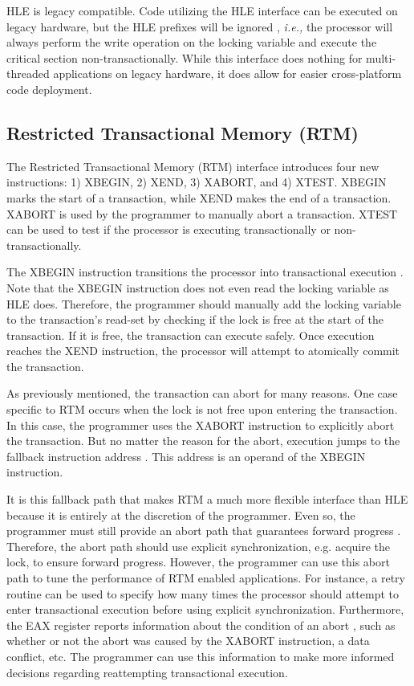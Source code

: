 \documentclass[11pt]{book}
\begin{document}
HLE is legacy compatible.  Code utilizing the HLE interface can be executed on legacy
hardware, but the HLE prefixes will be ignored \cite{intel_prog_ref}, \emph{i.e.,} the
processor will always perform the write operation on the locking variable and execute the
critical section non-transactionally.  While this interface does nothing for
multi-threaded applications on legacy hardware, it does allow for easier cross-platform
code deployment.

\subsection{Restricted Transactional Memory (RTM)}\label{sec:rtm}

The Restricted Transactional Memory (RTM) interface introduces four new instructions: 1)
XBEGIN, 2) XEND, 3) XABORT, and 4) XTEST.  XBEGIN marks the start of a transaction, while
XEND makes the end of a transaction.  XABORT is used by the programmer to manually abort a
transaction.  XTEST can be used to test if the processor is executing transactionally or
non-transactionally.

The XBEGIN instruction transitions the processor into transactional execution
\cite{intel_prog_ref}.  Note that the XBEGIN instruction does not even read the locking
variable as HLE does.  Therefore, the programmer should manually add the locking variable
to the transaction's read-set by checking if the lock is free at the start of the
transaction.  If it is free, the transaction can execute safely.  Once execution reaches
the XEND instruction, the processor will attempt to atomically commit the transaction.

As previously mentioned, the transaction can abort for many reasons.  One case specific to
RTM occurs when the lock is not free upon entering the transaction.  In this case, the
programmer uses the XABORT instruction to explicitly abort the transaction.  But no matter
the reason for the abort, execution jumps to the fallback instruction address
\cite{intel_prog_ref}.  This address is an operand of the XBEGIN instruction.

It is this fallback path that makes RTM a much more flexible interface than HLE because it
is entirely at the discretion of the programmer.  Even so, the programmer must still
provide an abort path that guarantees forward progress \cite{intel_prog_ref}.  Therefore,
the abort path should use explicit synchronization, e.g. acquire the lock, to ensure
forward progress. However, the programmer can use this abort path to tune the performance
of RTM enabled applications.  For instance, a retry routine can be used to specify how
many times the processor should attempt to enter transactional execution before using
explicit synchronization.  Furthermore, the EAX register reports information about the
condition of an abort \cite{intel_prog_ref}, such as whether or not the abort was caused
by the XABORT instruction, a data conflict, etc.  The programmer can use this information
to make more informed decisions regarding reattempting transactional execution.
\end{document}
